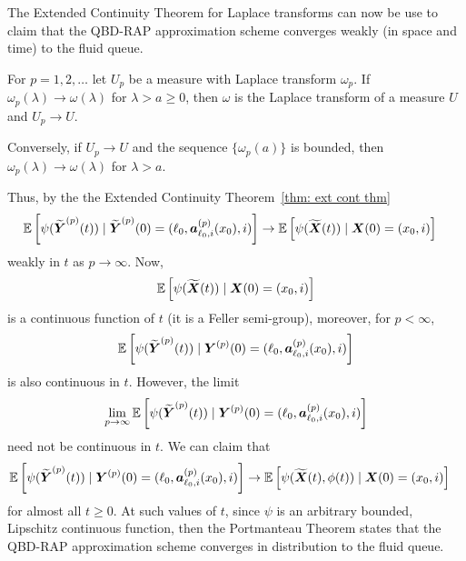 The Extended Continuity Theorem for Laplace transforms \cite[Chapter XIII, Theorem 2a]{feller1957} can now be use to claim that the QBD-RAP approximation scheme converges weakly (in space and time) to the fluid queue.
\begin{thm}\label{thm: ext cont thm}
	For \(p=1,2,\dots\) let \(U_p\) be a measure with Laplace transform \(\omega_p\). If \(\omega_p(\lambda)\to\omega(\lambda)\) for \(\lambda > a\geq 0\), then \(\omega\) is the Laplace transform of a measure \(U\) and \(U_p\to U\).
	
	Conversely, if \(U_p\to U\) and the sequence \(\{\omega_p(a)\}\) is bounded, then \(\omega_p(\lambda)\to\omega(\lambda)\) for \(\lambda >a\). 
\end{thm}
Thus, by the the Extended Continuity Theorem~\ref{thm: ext cont thm}
\begin{align}
		&\mathbb E\left[\psi(\widetilde{\boldsymbol Y}^{(p)}(t))  \mid \widetilde{\boldsymbol Y}^{(p)}(0)=(\ell_0, \boldsymbol  a_{\ell_0,i}^{(p)}(x_0),i) \right] 
		\to \mathbb E\left[\psi(\widetilde{\boldsymbol X}(t))\mid \boldsymbol X(0)=(x_0, i) \right] \nonumber
\end{align}
weakly in \(t\) as \(p\to \infty\). Now, \[\mathbb E\left[\psi(\widetilde{\boldsymbol X}(t))\mid \boldsymbol X(0)=(x_0,i) \right]\] is a continuous function of \(t\) (it is a Feller semi-group), moreover, for \(p<\infty\), \[\mathbb E\left[\psi(\widetilde{\boldsymbol Y}^{(p)}(t))  \mid \boldsymbol Y^{(p)}(0)=(\ell_0, \boldsymbol  a_{\ell_0,i}^{(p)}(x_0), i) \right] \] is also continuous in \(t\). However, the limit \[\lim\limits_{p\to\infty}\mathbb E\left[\psi(\widetilde{\boldsymbol Y}^{(p)}(t))  \mid \boldsymbol Y^{(p)}(0)=(\ell_0, \boldsymbol  a_{\ell_0,i}^{(p)}(x_0),i) \right] \] need not be continuous in \(t\). We can claim that 
\begin{align}
		&\mathbb E\left[\psi(\widetilde{\boldsymbol Y}^{(p)}(t))  \mid \boldsymbol Y^{(p)}(0)=(\ell_0, \boldsymbol  a_{\ell_0,i}^{(p)}(x_0), i) \right] \nonumber
		\to \mathbb E\left[\psi(\widetilde{\boldsymbol X}(t),\phi(t))\mid \boldsymbol X(0)=(x_0, i) \right] \nonumber
\end{align}
for almost all \(t\geq 0\). At such values of \(t\), since \(\psi\) is an arbitrary bounded, Lipschitz continuous function, then the Portmanteau Theorem states that the QBD-RAP approximation scheme converges in distribution to the fluid queue.

